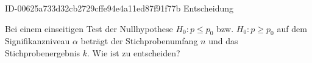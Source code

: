 \begin{exercise}
      {ID-00625a733d32cb2729cffe94e4a11ed87f91f77b}
      {Entscheidung}
  \ifproblem\problem\par
    Bei einem einseitigen Test der Nullhypothese $H_0:p\leq p_0$ bzw.
    $H_0:p\geq p_0$ auf dem Signifikanzniveau $\alpha$ beträgt der
    Stichprobenumfang $n$ und das Stichprobenergebnis $k$. Wie ist zu
    entscheiden?
    \begin{center}
      \qquad{}\\[1ex]
      \makebox[6em][r]{}\qquad{}
      \\[2ex]
      \qquad{}\\[1ex]
      \makebox[6em][r]{}\qquad{}
    \end{center}
  \fi
\end{exercise}
